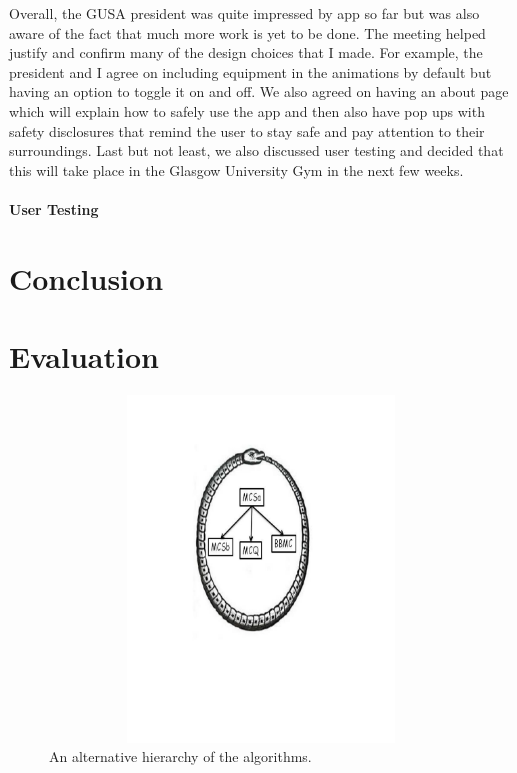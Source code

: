 \documentclass{l4proj}
\begin{document}
Overall, the GUSA president was quite impressed by app so far but was also aware of the fact that much more work is yet to be done. The meeting helped justify and confirm many of the design choices that I made. For example, the president and I agree on including equipment in the animations by default but having an option to toggle it on and off. We also agreed on having an about page which will explain how to safely use the app and then also have pop ups with safety disclosures that remind the user to stay safe and pay attention to their surroundings. Last but not least, we also discussed user testing and decided that this will take place in the Glasgow University Gym in the next few weeks.


\subsubsection{User Testing}

\chapter{Conclusion}

\chapter{Evaluation}

\begin{figure}
\centering
\includegraphics[height=9.2cm,width=13.2cm]{uroboros.pdf}
\vspace{-30mm}
\caption{An alternative hierarchy of the algorithms.}
\label{uroborus}
\end{figure}
\end{document}

